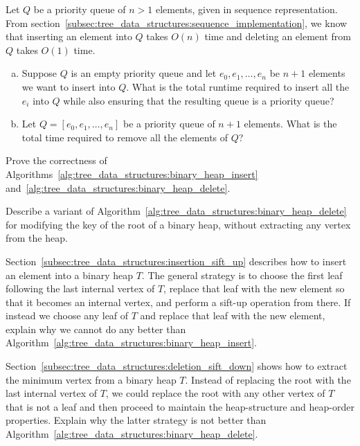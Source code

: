 \begin{problem}
\item Let $Q$ be a priority queue of $n > 1$ elements, given in
  sequence representation. From
  section~\ref{subsec:tree_data_structures:sequence_implementation},
  we know that inserting an element into $Q$ takes $O(n)$ time and
  deleting an element from $Q$ takes $O(1)$ time.
  \begin{enumerate}[(a)]
  \item Suppose $Q$ is an empty priority queue and let
    $e_0, e_1, \dots, e_n$ be $n + 1$ elements we want to insert into
    $Q$. What is the total runtime required to insert all the $e_i$
    into $Q$ while also ensuring that the resulting queue is a
    priority queue?

  \item Let $Q = [e_0, e_1, \dots, e_n]$ be a priority queue of
    $n + 1$ elements. What is the total time required to remove all
    the elements of $Q$?
  \end{enumerate}

\item Prove the correctness of
  Algorithms~\ref{alg:tree_data_structures:binary_heap_insert}
  and~\ref{alg:tree_data_structures:binary_heap_delete}.

\item Describe a variant of
  Algorithm~\ref{alg:tree_data_structures:binary_heap_delete} for
  modifying the key of the root of a binary heap, without extracting
  any vertex from the heap.

\item Section~\ref{subsec:tree_data_structures:insertion_sift_up}
  describes how to insert an element into a binary heap $T$. The
  general strategy is to choose the first leaf following the last
  internal vertex of $T$, replace that leaf with the new element so
  that it becomes an internal vertex, and perform a sift-up operation
  from there. If instead we choose any leaf of $T$ and replace that
  leaf with the new element, explain why we cannot do any better than
  Algorithm~\ref{alg:tree_data_structures:binary_heap_insert}.

\item Section~\ref{subsec:tree_data_structures:deletion_sift_down}
  shows how to extract the minimum vertex from a binary heap
  $T$. Instead of replacing the root with the last internal vertex of
  $T$, we could replace the root with any other vertex of $T$ that is
  not a leaf and then proceed to maintain the heap-structure and
  heap-order properties. Explain why the latter strategy is not better
  than Algorithm~\ref{alg:tree_data_structures:binary_heap_delete}.


\end{problem}

